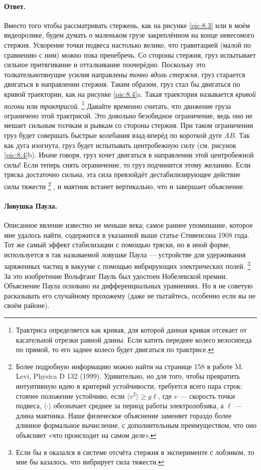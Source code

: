 \paragraph{Ответ.}
Вместо того чтобы рассматривать стержень, как на рисунке
\ref{pic:8.3} или в моём видеоролике, будем думать о маленьком грузе закреплённом на конце невесомого стержня.
Ускорение точки подвеса настолько велико, что гравитацией (малой по сравнению с ним) можно пока пренебречь.
Со стороны стержня, груз испытывает сильное притягивание и отталкивание поочерёдно.
Поскольку это толкательнотянущие усилия направлены \emph{точно вдоль стержня}, груз старается двигаться в направлении стержня.
Таким образом, груз стал бы двигаться по кривой траектории, как на рисунке \ref{pic:8.4}a.
Такая траектория называется \emph{кривой погони} или \emph{трактрисой}.%
\footnote{Трактриса определяется как кривая, для которой данная кривая отсекает от касательной отрезки равной длины. Если катить переднее колесо велосипеда по прямой, то его заднее колесо будет двигаться по трактрисе.}
Давайте временно считать, что движение груза ограничено этой трактрисой.
Это довольно безобидное ограничение, ведь оно не мешает сильным толчкам и рывкам со стороны стержня.
При таком ограничении груз будет совершать быстрые колебания взад-вперёд по короткой дуге $AB$.
Так как дуга изогнута, груз будет испытывать центробежную силу (см. рисунок \ref{pic:8.4}b).
Иначе говоря, груз хочет двигаться в направлении этой центробежной силы!
Если теперь снять ограничение, то груз подчинится этому желанию.
Если тряска достаточно сильна, эта сила превзойдёт дестабилизирующее действие силы тяжести%
\footnote{Более подробную информацию можно найти на странице 158 в работе M. Levi, Physica D 132 (1999).
Удивительно, но для того, чтобы превратить интуитивную идею в критерий устойчивости, требуется всего пара строк: стоячее положение устойчиво, если  $
\langle v^2 \rangle \ge g \ell$,
где $v$ --- скорость точки подвеса, $\langle \cdot \rangle$ обозначает среднее за период работы электролобзика, а $\ell$ --- длина маятника.
Наше физическое объяснение заменяет гораздо более длинное формальное вычисление, с дополнительным преимуществом, что оно объясняет «что происходит на самом деле».}%
, и маятник встанет вертикально,
что и завершает объяснение.

\paragraph{Ловушка Паула.}
Описанное явление известно не меньше века;
самое раннее упоминание, которое мне удалось найти, содержится в указанной выше статье Стивенсона 1908 года.
Тот же самый эффект стабилизации с помощью тряски, но в иной форме, используется в так называемой ловушке Паула --- устройстве для удерживания заряженных частиц в вакууме с помощью вибрирующих электрических полей.%
\footnote{Если бы я оказался в системе отсчёта стержня в эксперименте с лобзиком, то мне бы казалось, что вибрирует сила тяжести.}
За это изобретение Вольфганг Пауль был удостоен Нобелевской премии.
Объяснение Паула основано на дифференциальных уравнениях.
Но я не советую расказывать его случайному прохожему (даже не пытайтесь, особенно если вы не своём районе).


